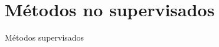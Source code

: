 \section{Métodos no supervisados}
\begin{frame}{Métodos supervisados}
\begin{columns}
\begin{column}{0.9\textwidth}

\end{column}
\end{columns}
\end{frame}



